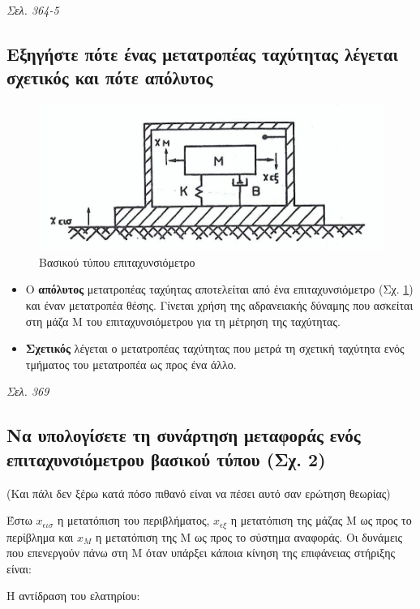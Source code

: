 \documentclass{article}
\begin{document}
\emph{Σελ. 364-5}

\subsection{Εξηγήστε πότε ένας μετατροπέας ταχύτητας λέγεται σχετικός και πότε απόλυτος}

\begin{figure}[h!]
    \includegraphics[width=\linewidth]{epitaxinsiometro.png}
    \caption{Βασικού τύπου επιταχυνσιόμετρο}
    \label{fig:5.1epitax}
\end{figure}

\begin{itemize}
    \item Ο \textbf{απόλυτος} μετατροπέας ταχύητας αποτελείται από ένα επιταχυνσιόμετρο (Σχ. \ref{fig:5.1epitax}) και έναν μετατροπέα θέσης.
        Γίνεται χρήση της  αδρανειακής δύναμης που ασκείται στη μάζα Μ του επιταχυνσιόμετρου για τη μέτρηση της ταχύτητας.
    \item \textbf{Σχετικός} λέγεται ο μετατροπέας ταχύτητας που μετρά τη σχετική ταχύτητα ενός τμήματος του μετατροπέα ως προς ένα άλλο.
\end{itemize}

\emph{Σελ. 369}

\subsection{Να υπολογίσετε τη συνάρτηση μεταφοράς ενός επιταχυνσιόμετρου βασικού τύπου (Σχ. 2)}
(Και πάλι δεν ξέρω κατά πόσο πιθανό είναι να πέσει αυτό σαν ερώτηση θεωρίας)

Έστω $x_{\epsilon\iota\sigma}$ η μετατόπιση του περιβλήματος, $x_{\epsilon\xi}$ η μετατόπιση της μάζας Μ ως προς το περίβλημα και $x_M$
η μετατόπιση της Μ ως προς το σύστημα αναφοράς. Οι δυνάμεις που επενεργούν πάνω στη Μ όταν υπάρξει κάποια κίνηση της επιφάνειας στήριξης 
είναι:

Η αντίδραση του ελατηρίου:
\end{document}
